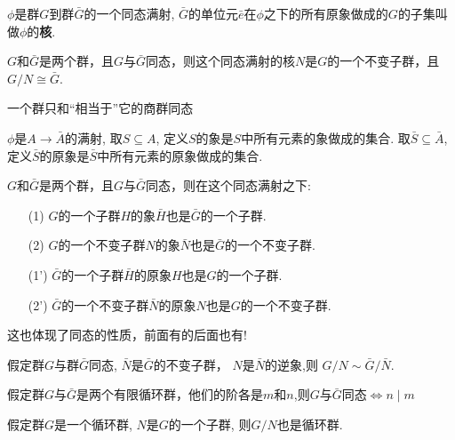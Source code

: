 \begin{Definition}[核]
$\phi$是群$G$到群$\bar{G}$的一个同态满射, $\bar{G}$的单位元$\bar{e}$在$\phi$之下的所有原象做成的$G$的子集叫做$\phi$的\textbf{核}.
\end{Definition}

\begin{Theorem}
$G$和$\bar{G}$是两个群，且$G$与$\bar{G}$同态，则这个同态满射的核$N$是$G$的一个不变子群，且$G/N \cong \bar{G}$.
\end{Theorem}

\begin{Remark}
一个群只和``相当于''它的商群同态
\end{Remark}

\begin{Definition}
$\phi$是$A \rightarrow \bar{A}$的满射, 取$S \subseteq A$, 定义$S$的象是$S$中所有元素的象做成的集合. 取$\bar{S} \subseteq \bar{A}$, 定义$\bar{S}$的原象是$\bar{S}$中所有元素的原象做成的集合.
\end{Definition}

\begin{Theorem}
$G$和$\bar{G}$是两个群，且$G$与$\bar{G}$同态，则在这个同态满射之下:
\begin{itemize}
\item[(1)] $G$的一个子群$H$的象$\bar{H}$也是$\bar{G}$的一个子群.
\item[(2)] $G$的一个不变子群$N$的象$\bar{N}$也是$\bar{G}$的一个不变子群.
\item[(1')] $\bar{G}$的一个子群$\bar{H}$的原象$H$也是$G$的一个子群.
\item[(2')] $\bar{G}$的一个不变子群$\bar{N}$的原象$N$也是$G$的一个不变子群.
\end{itemize}
\end{Theorem}

\begin{Remark}
这也体现了同态的性质，前面有的后面也有!
\end{Remark}

\begin{Proposition}
假定群$G$与群$\bar{G}$同态, $\bar{N}$是$\bar{G}$的不变子群， $N$是$\bar{N}$的逆象,则
$ G/N \sim \bar{G}/\bar{N} $.
\end{Proposition}

\begin{Proposition}
假定群$G$与$\bar{G}$是两个有限循环群，他们的阶各是$m$和$n$,则$G$与$\bar{G}$同态$\Leftrightarrow n \mid m$
\end{Proposition}

\begin{Proposition}
假定群$G$是一个循环群, $N$是$G$的一个子群, 则$G/N$也是循环群.
\end{Proposition}
